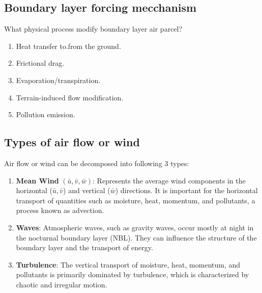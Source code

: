 \documentclass[fleqn,10pt]{SelfArx} %
\begin{document}
\subsection{Boundary layer forcing mecchanism}
What physical process modify boundary layer air parcel?
\begin{enumerate}[noitemsep]
	\item Heat transfer to.from the ground.
	\item Frictional drag.
	\item Evaporation/transpiration.
	\item Terrain-induced flow modification.
	\item Pollution emission.
\end{enumerate}

\subsection{Types of air flow or wind}
Air flow or wind can be decomposed into following 3 types:
\begin{enumerate}[noitemsep]
	\item \textbf{Mean Wind} $(\bar{u}, \bar{v}, \bar{w})$: Represents the average wind components in the horizontal ($\bar{u}, \bar{v}$) and vertical ($\bar{w}$) directions. It is important for the horizontal transport of quantities such as moisture, heat, momentum, and pollutants, a process known as advection.
	\item \textbf{Waves}: Atmospheric waves, such as gravity waves, occur mostly at night in the nocturnal boundary layer (NBL). They can influence the structure of the boundary layer and the transport of energy.
	\item \textbf{Turbulence}: The vertical transport of moisture, heat, momentum, and pollutants is primarily dominated by turbulence, which is characterized by chaotic and irregular motion.
\end{enumerate}

\end{document}
